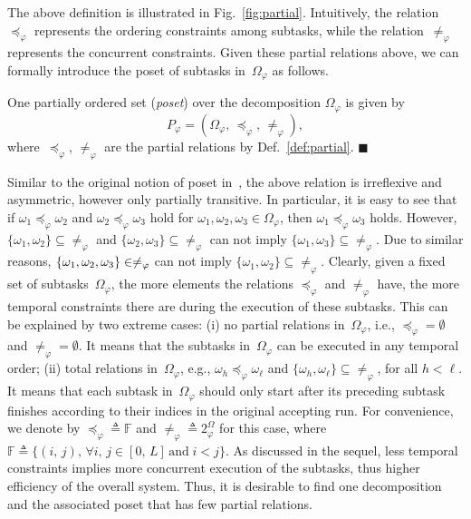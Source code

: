 The above definition is illustrated in Fig.~\ref{fig:partial}.
Intuitively, the relation~$\preceq_{\varphi}$ represents the ordering
constraints among subtasks,
while the relation~$\neq_{\varphi}$ represents the concurrent constraints.
Given these partial relations above, we can formally introduce the poset of subtasks in~$\Omega_{\varphi}$ as follows.


\begin{definition}\label{def:poset}
One partially ordered set (\emph{poset}) over the decomposition $\Omega_{\varphi}$ is given by
\begin{equation}\label{eq:poset}
P_{\varphi} = (\Omega_{\varphi}, \, \preceq_{\varphi}, \, \neq_{\varphi}),
\end{equation}
where~$\preceq_{\varphi}$, $\neq_{\varphi}$ are the partial relations by
Def.~\ref{def:partial}.
\hfill $\blacksquare$
\end{definition}

Similar to the original notion of poset in~\citep{simovici2008mathematical},
the above relation is irreflexive and asymmetric,
however only partially transitive.
In particular, it is easy to see that
if $\omega_1\preceq_{\varphi} \omega_2$ and $\omega_2\preceq_{\varphi} \omega_3$
hold for $\omega_1,\omega_2,\omega_3\in \Omega_{\varphi}$,
then $\omega_1\preceq_{\varphi}\omega_3$ holds.
However, $\{\omega_1,\omega_2\}\subseteq\neq_{\varphi} $ and $\{\omega_2,\omega_3\}\subseteq\neq_{\varphi}$
can not imply $\{\omega_1,\omega_3\}\subseteq\neq_{\varphi}$.
Due to similar reasons, $\{\omega_1,\omega_2,\\\omega_3\}\in\neq_\varphi$ can not imply $\{\omega_1,\omega_2\}\subseteq\neq_{\varphi}$.
Clearly, given a fixed set of subtasks~$\Omega_{\varphi}$, the more elements
the relations $\preceq_{\varphi}$ and $\neq_{\varphi}$ have,
the more temporal constraints there are during the execution of these subtasks.
This can be explained by two extreme cases:
(i) no partial relations in~$\Omega_{\varphi}$, i.e.,
$\preceq_{\varphi}=\emptyset$ and $\neq_{\varphi}=\emptyset$.
It means that the subtasks in~$\Omega_{\varphi}$ can be executed in any temporal order;
(ii) total relations in~$\Omega_{\varphi}$,
e.g., $\omega_h \preceq_{\varphi} \omega_\ell$
and $\{\omega_h, \omega_\ell \}\subseteq\neq_{\varphi} $, for all $h<\ell$.
It means that each subtask in~$\Omega_{\varphi}$ should only start after
its preceding subtask finishes according to their indices in the original accepting run.
For convenience, we denote by $\preceq_{\varphi} \triangleq \mathbb{F}$
and $\neq_{\varphi} \triangleq 2^\Omega_{\varphi}$ for this case,
where $\mathbb{F}\triangleq \{(i,\, j),\, \forall i,\,j\in [0,\, L] \,\text{and}\; i<j\}$.
As discussed in the sequel,
less temporal constraints implies more concurrent execution of the subtasks,
thus higher efficiency of the overall system.
Thus, it is desirable to find one decomposition and the associated poset
that has few partial relations.


